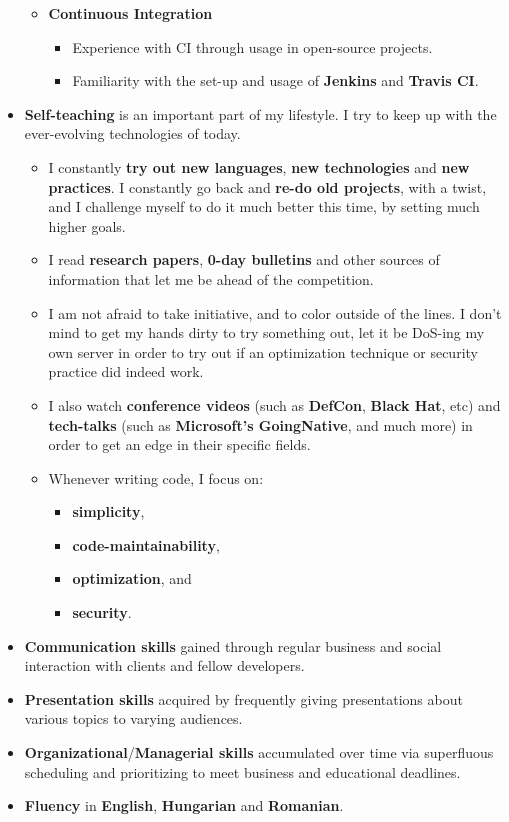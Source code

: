 \documentclass[12pt,a4paper]{article}
\begin{document}
\begin{itemize}
\begin{itemize}
\begin{itemize}
			\end{itemize}
		\item	\textbf{Continuous Integration}
			\begin{itemize}
				\item	Experience with CI through usage in open-source projects.
				\item	Familiarity with the set-up and usage of \textbf{Jenkins} and \textbf{Travis CI}.
			\end{itemize}
		\end{itemize}
	\item	\textbf{Self-teaching} is an important part of my lifestyle. I try to keep up with the ever-evolving technologies of today.
		\begin{itemize}
		\item	I constantly \textbf{try out new languages}, \textbf{new technologies} and \textbf{new practices}. I constantly go back and \textbf{re-do old projects}, with a twist, and I challenge myself to do it much better this time, by setting much higher goals.
		\item	I read \textbf{research papers}, \textbf{0-day bulletins} and other sources of information that let me be ahead of the competition.
		\item	I am not afraid to take initiative, and to color outside of the lines. I don't mind to get my hands dirty to try something out, let it be DoS-ing my own server in order to try out if an optimization technique or security practice did indeed work.
		\item	I also watch \textbf{conference videos} (such as \textbf{DefCon}, \textbf{Black Hat}, etc) and \textbf{tech-talks} (such as \textbf{Microsoft's GoingNative}, and much more) in order to get an edge in their specific fields.
		\item	Whenever writing code, I focus on:
			\begin{itemize}
			\item	\textbf{simplicity},
			\item	\textbf{code-maintainability},
			\item	\textbf{optimization}, and
			\item	\textbf{security}.
			\end{itemize}
		\end{itemize}
	\item	\textbf{Communication skills} gained through regular business and social interaction with clients and fellow developers.
	\item	\textbf{Presentation skills} acquired by frequently giving presentations about various topics to varying audiences.
	\item	\textbf{Organizational}/\textbf{Managerial skills} accumulated over time via superfluous scheduling and prioritizing to meet business and educational deadlines.
	\item	\textbf{Fluency} in \textbf{English}, \textbf{Hungarian} and \textbf{Romanian}.
	\end{itemize}
\end{document}
